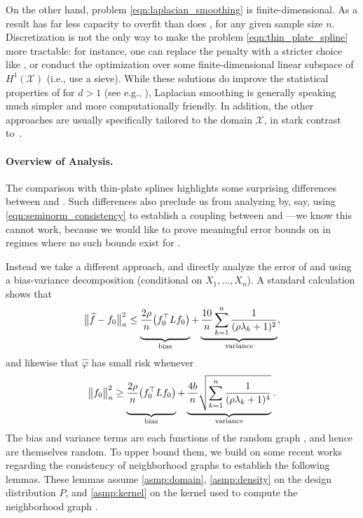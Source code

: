 \documentclass[twoside]{article}
\newcommand{\1}{\mathbf{1}}
\DeclareMathOperator*{\esssup}{ess\,sup}
\newcommand{\Xset}{\mathcal{X}}
\newcommand{\wt}[1]{\widetilde{#1}}
\newcommand{\wh}[1]{\widehat{#1}}
\theoremstyle{definition}
\theoremstyle{remark}
\begin{document}
On the other hand, problem \eqref{eqn:laplacian_smoothing} is finite-dimensional. As a result \smash{$\wh{f}$} has far less capacity to overfit than does \smash{$\wt{f}$}, for any given sample size $n$. Discretization is not the only way to make the problem \eqref{eqn:thin_plate_spline} more tractable: for instance, one can replace the penalty \smash{$\int_{\Xset} \|\nabla f(x)\|_2^2 \,dx$} with a stricter choice like \smash{$\esssup_{x \in \Xset} \|\nabla f(x)\|_2$}, or conduct the optimization over some finite-dimensional linear subspace of $H^1(\Xset)$ (i.e., use a sieve). While these solutions do improve the statistical properties of \smash{$\wt{f}$} for $d > 1$ (see e.g., \citet{birge1993,birge1998,vandergeer2000}), Laplacian smoothing is generally speaking much simpler and more computationally friendly. In addition, the other approaches are usually specifically tailored to the domain $\Xset$, in stark contrast to~\smash{$\wh{f}$}.

\paragraph{Overview of Analysis.}

The comparison with thin-plate splines highlights some surprising differences between \smash{$\wh{f}$} and \smash{$\wt{f}$}. Such differences also preclude us from analyzing \smash{$\wh{f}$} by, say, using \eqref{eqn:seminorm_consistency} to establish a coupling between \smash{$\wh{f}$} and \smash{$\wt{f}$}---we know this cannot work, because we would like to prove meaningful error bounds on \smash{$\wh{f}$} in regimes where no such bounds exist for \smash{$\wt{f}$}.

Instead we take a different approach, and directly analyze the error of \smash{$\wh{f}$} and \smash{$\wh{T}$} using a bias-variance decomposition (conditional on $X_1,\ldots,X_n$). A standard calculation shows that
\begin{equation*}
\bigl\|\wh{f} - f_0\bigr\|_n^2 \leq \underbrace{\vphantom{\sum_{k=1}^n}\frac{2\rho}{n} \bigl(f_0^\top L f_0\bigr)}_{\textrm{bias}} + \underbrace{\frac{10}{n} \sum_{k = 1}^{n} \frac{1}{(\rho \lambda_k + 1)^2}}_{\textrm{variance}},
\end{equation*}
and likewise that $\wh{\varphi}$ has small risk whenever
\begin{equation*}
\bigl\|f_0\bigr\|_n^2 \geq \underbrace{\vphantom{\sqrt{\sum_{k=1}^n}}\frac{2\rho}{n} \bigl(f_0^\top L f_0\bigr)}_{\textrm{bias}} + \underbrace{\frac{4b}{n} \sqrt{\sum_{k = 1}^{n} \frac{1}{(\rho \lambda_k + 1)^4}}}_{\textrm{variance}}.
\end{equation*}
The bias and variance terms are each functions of the random graph , and hence are themselves random. To upper bound them, we build on some recent works \citep{burago2014,trillos2019,calder2019} regarding the consistency of neighborhood graphs to establish the following lemmas. These lemmas assume \ref{asmp:domain}, \ref{asmp:density} on the design distribution $P$, and \ref{asmp:kernel} on the kernel used to compute the neighborhood graph . 
\end{document}
